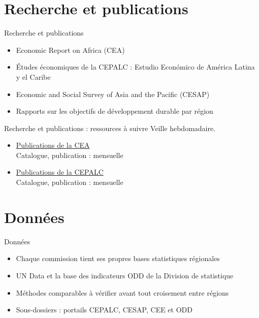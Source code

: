 \documentclass[aspectratio=169,11pt]{beamer}
\begin{document}
\section{Recherche et publications}
\begin{frame}{Recherche et publications}
\begin{itemize}
\item Economic Report on Africa (CEA)
\item Études économiques de la CEPALC : Estudio Económico de América Latina y el Caribe
\item Economic and Social Survey of Asia and the Pacific (CESAP)
\item Rapports sur les objectifs de développement durable par région
\end{itemize}
\end{frame}

\begin{frame}{Recherche et publications : ressources à suivre}
\small
Veille hebdomadaire.
\begin{itemize}
\item \href{https://www.uneca.org/publications}{Publications de la CEA}\\{\footnotesize Catalogue, publication : mensuelle}
\item \href{https://www.cepal.org/en/publications}{Publications de la CEPALC}\\{\footnotesize Catalogue, publication : mensuelle}
\end{itemize}
\end{frame}

\section{Données}
\begin{frame}{Données}
\begin{itemize}
\item Chaque commission tient ses propres bases statistiques régionales
\item UN Data et la base des indicateurs ODD de la Division de statistique
\item Méthodes comparables à vérifier avant tout croisement entre régions
\item Sous-dossiers : portails CEPALC, CESAP, CEE et ODD
\end{itemize}
\end{frame}
\end{document}
